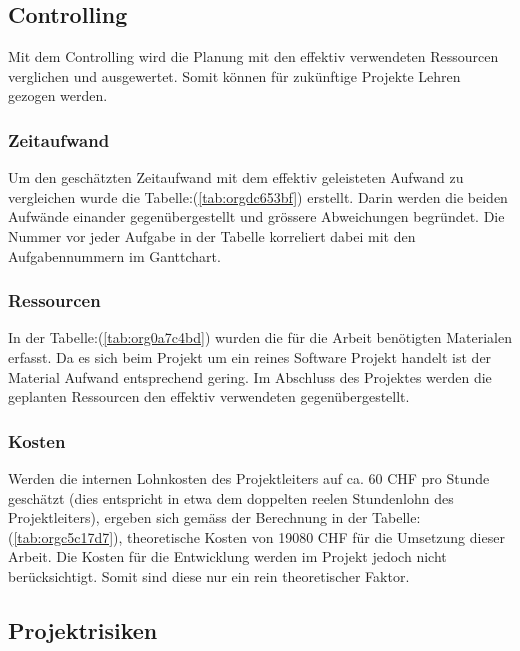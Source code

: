\subsection{Controlling}
\label{sec:org208d93d}

Mit dem Controlling wird die Planung mit den effektiv verwendeten Ressourcen
verglichen und ausgewertet. Somit können für zukünftige Projekte Lehren gezogen
werden.

\subsubsection{Zeitaufwand}
\label{sec:org48b7af7}

Um den geschätzten Zeitaufwand mit dem effektiv geleisteten Aufwand zu
vergleichen wurde die Tabelle:(\ref{tab:orgdc653bf}) erstellt. Darin werden die beiden
Aufwände einander gegenübergestellt und grössere Abweichungen begründet.
Die Nummer vor jeder Aufgabe in der Tabelle korreliert dabei mit den
Aufgabennummern im Ganttchart.

\subsubsection{Ressourcen}
\label{sec:orgf32159d}

In der Tabelle:(\ref{tab:org0a7c4bd}) wurden die für die Arbeit benötigten Materialen
erfasst. Da es sich beim Projekt um ein reines Software Projekt handelt ist der
Material Aufwand entsprechend gering. Im Abschluss des Projektes werden die
geplanten Ressourcen den effektiv verwendeten gegenübergestellt.
\pagebreak
\subsubsection{Kosten}
\label{sec:org7c0906b}

Werden die internen Lohnkosten des Projektleiters auf ca. 60 CHF pro Stunde
geschätzt (dies entspricht in etwa dem doppelten reelen Stundenlohn des
Projektleiters), ergeben sich gemäss der Berechnung in der
Tabelle:(\ref{tab:orgc5c17d7}), theoretische Kosten von 19080 CHF für die Umsetzung
dieser Arbeit. Die Kosten für die Entwicklung werden im Projekt jedoch nicht
berücksichtigt. Somit sind diese nur ein rein theoretischer Faktor.

\subsection{Projektrisiken}
\label{sec:orge68685e}

